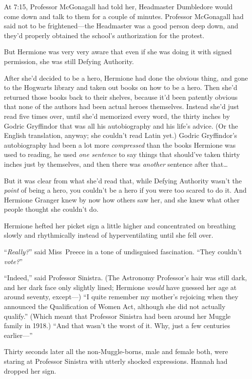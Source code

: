 At 7:15\pm, Professor McGonagall had told her, Headmaster Dumbledore would come down and talk to them for a couple of minutes. Professor McGonagall had said not to be frightened—the Headmaster was a good person deep down, and they’d properly obtained the school’s authorization for the protest.

But Hermione was very very aware that even if she was doing it with signed permission, she was still Defying Authority.

After she’d decided to be a hero, Hermione had done the obvious thing, and gone to the Hogwarts library and taken out books on how to be a hero. Then she’d returned those books back to their shelves, because it’d been patently obvious that none of the authors had been actual heroes themselves. Instead she’d just read five times over, until she’d memorized every word, the thirty inches by Godric Gryffindor that was all his autobiography and his life’s advice. (Or the English translation, anyway; she couldn’t read Latin yet.) Godric Gryffindor’s autobiography had been a lot more \emph{compressed} than the books Hermione was used to reading, he used \emph{one sentence} to say things that should’ve taken thirty inches just by themselves, and then there was \emph{another} sentence after that…

But it was clear from what she’d read that, while Defying Authority wasn’t the \emph{point} of being a hero, you couldn’t be a hero if you were too scared to do it. And Hermione Granger knew by now how others saw her, and she knew what other people thought she couldn’t do.

Hermione hefted her picket sign a little higher and concentrated on breathing slowly and rhythmically instead of hyperventilating until she fell over.

“\emph{Really?}” said Miss~Preece in a tone of undisguised fascination. “They couldn’t \emph{vote?}”

“Indeed,” said Professor Sinistra. (The Astronomy Professor’s hair was still dark, and her dark face only slightly lined; Hermione \emph{would} have guessed her age at around seventy, except—) “I quite remember my mother’s rejoicing when they announced the Qualification of Women Act, although she did not actually qualify.” (Which meant that Professor Sinistra had been around her Muggle family in 1918.) “And that wasn’t the worst of it. Why, just a few centuries earlier—”

Thirty seconds later all the non-Muggle-borns, male and female both, were staring at Professor Sinistra with utterly shocked expressions. Hannah had dropped her sign.

